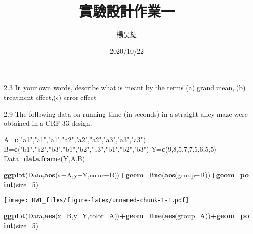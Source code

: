 \documentclass[
]{article}
\title{實驗設計作業一}
\author{楊昊紘}
\date{2020/10/22}
\newenvironment{Shaded}{\begin{snugshade}}{\end{snugshade}}
\newcommand{\DataTypeTok}[1]{\textcolor[rgb]{0.13,0.29,0.53}{#1}}
\newcommand{\DecValTok}[1]{\textcolor[rgb]{0.00,0.00,0.81}{#1}}
\newcommand{\KeywordTok}[1]{\textcolor[rgb]{0.13,0.29,0.53}{\textbf{#1}}}
\newcommand{\NormalTok}[1]{#1}
\newcommand{\OperatorTok}[1]{\textcolor[rgb]{0.81,0.36,0.00}{\textbf{#1}}}
\newcommand{\StringTok}[1]{\textcolor[rgb]{0.31,0.60,0.02}{#1}}
\begin{document}
\maketitle

2.3 In your own words, describe what is meant by the terms (a) grand
mean, (b) treatment effect,(c) error effect

2.9 The following data on running time (in seconds) in a straight-alley
maze were obtained in a CRF-33 design.

\begin{Shaded}
\begin{Highlighting}[]
\NormalTok{A=}\KeywordTok{c}\NormalTok{(}\StringTok{"a1"}\NormalTok{,}\StringTok{"a1"}\NormalTok{,}\StringTok{"a1"}\NormalTok{,}\StringTok{"a2"}\NormalTok{,}\StringTok{"a2"}\NormalTok{,}\StringTok{"a2"}\NormalTok{,}\StringTok{"a3"}\NormalTok{,}\StringTok{"a3"}\NormalTok{,}\StringTok{"a3"}\NormalTok{)}
\NormalTok{B=}\KeywordTok{c}\NormalTok{(}\StringTok{"b1"}\NormalTok{,}\StringTok{"b2"}\NormalTok{,}\StringTok{"b3"}\NormalTok{,}\StringTok{"b1"}\NormalTok{,}\StringTok{"b2"}\NormalTok{,}\StringTok{"b3"}\NormalTok{,}\StringTok{"b1"}\NormalTok{,}\StringTok{"b2"}\NormalTok{,}\StringTok{"b3"}\NormalTok{)}
\NormalTok{Y=}\KeywordTok{c}\NormalTok{(}\DecValTok{9}\NormalTok{,}\DecValTok{8}\NormalTok{,}\DecValTok{5}\NormalTok{,}\DecValTok{7}\NormalTok{,}\DecValTok{7}\NormalTok{,}\DecValTok{5}\NormalTok{,}\DecValTok{6}\NormalTok{,}\DecValTok{5}\NormalTok{,}\DecValTok{5}\NormalTok{)}
\NormalTok{Data=}\KeywordTok{data.frame}\NormalTok{(Y,A,B)}

\KeywordTok{ggplot}\NormalTok{(Data,}\KeywordTok{aes}\NormalTok{(}\DataTypeTok{x=}\NormalTok{A,}\DataTypeTok{y=}\NormalTok{Y,}\DataTypeTok{color=}\NormalTok{B))}\OperatorTok{+}\KeywordTok{geom_line}\NormalTok{(}\KeywordTok{aes}\NormalTok{(}\DataTypeTok{group=}\NormalTok{B))}\OperatorTok{+}\KeywordTok{geom_point}\NormalTok{(}\DataTypeTok{size=}\DecValTok{5}\NormalTok{)}
\end{Highlighting}
\end{Shaded}

\texttt{[image: HW1\_files/figure-latex/unnamed-chunk-1-1.pdf]}

\begin{Shaded}
\begin{Highlighting}[]
\KeywordTok{ggplot}\NormalTok{(Data,}\KeywordTok{aes}\NormalTok{(}\DataTypeTok{x=}\NormalTok{B,}\DataTypeTok{y=}\NormalTok{Y,}\DataTypeTok{color=}\NormalTok{A))}\OperatorTok{+}\KeywordTok{geom_line}\NormalTok{(}\KeywordTok{aes}\NormalTok{(}\DataTypeTok{group=}\NormalTok{A))}\OperatorTok{+}\KeywordTok{geom_point}\NormalTok{(}\DataTypeTok{size=}\DecValTok{5}\NormalTok{)}
\end{Highlighting}
\end{Shaded}
\end{document}
